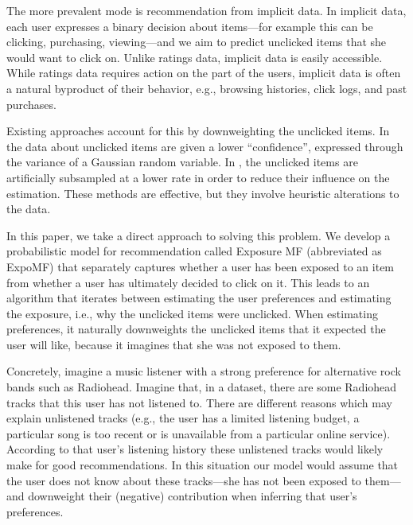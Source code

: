 
The more prevalent mode is recommendation from implicit data.  In
implicit data, each user expresses a binary decision about items---for
example this can be clicking, purchasing, viewing---and we aim to
predict unclicked items that she would want to click on. Unlike
ratings data, implicit data is easily accessible.  While ratings data
requires action on the part of the users, implicit data is often a
natural byproduct of their behavior, e.g., browsing histories, click
logs, and past purchases.



Existing approaches account for this by downweighting the unclicked
items.  In \citet{hu2008collaborative} the data about unclicked items are given a
lower ``confidence'', expressed through the variance of a Gaussian
random variable.  In \citet{rendle2009bpr}, the unclicked items are artificially
subsampled at a lower rate in order to reduce their influence on the
estimation.  These methods are effective, but they involve heuristic
alterations to the data.

In this paper, we take a direct approach to solving this problem.  We
develop a probabilistic model for recommendation called Exposure MF
(abbreviated as ExpoMF) that separately captures whether a user has been exposed to an item from
whether a user has ultimately decided to click on it.  This leads to an
algorithm that iterates between estimating the user preferences and
estimating the exposure, i.e., why the unclicked items were unclicked.
When estimating preferences, it naturally downweights the unclicked items
that it expected the user will like, because it imagines that she was not
exposed to them. 

Concretely, imagine a music listener with a strong preference for alternative
rock bands such as Radiohead. Imagine that, in a dataset, there are some
Radiohead tracks that this user has not listened to. There are different
reasons which may explain unlistened tracks  (e.g., the user has a limited
listening budget, a particular song is too recent or is unavailable from a
particular online service). According to that user's listening history these
unlistened tracks would likely make for good recommendations. In this situation
our model would assume that the user does not know about these tracks---she has
not been exposed to them---and downweight their (negative) contribution when
inferring that user's preferences.


